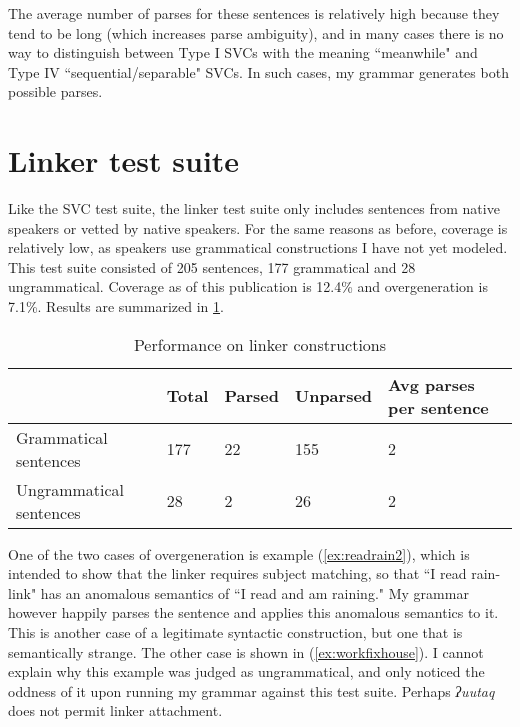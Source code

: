 The average number of parses for these sentences is relatively high because they tend to be long (which increases parse ambiguity), and in many cases there is no way to distinguish between Type I SVCs with the meaning ``meanwhile" and Type IV ``sequential/separable" SVCs. In such cases, my grammar generates both possible parses.

\section{Linker test suite} \label{ch:results:link}

Like the SVC test suite, the linker test suite only includes sentences from native speakers or vetted by native speakers. For the same reasons as before, coverage is relatively low, as speakers use grammatical constructions I have not yet modeled. This test suite consisted of 205 sentences, 177 grammatical and 28 ungrammatical. Coverage as of this publication is 12.4\% and overgeneration is 7.1\%. Results are summarized in \cref{table:link-coverage}.

\vspace{-10pt}

\begin{table}[H]
\centering
\caption{Performance on linker constructions}
\label{table:link-coverage}
\begin{tabular}{l|llll}
 & Total & Parsed & Unparsed & Avg parses per sentence \\ \hline
Grammatical sentences & 177 & 22 & 155 & 2 \\ \hline
Ungrammatical sentences & 28 & 2 & 26 & 2
\end{tabular}
\end{table}

\vspace{-10pt}

One of the two cases of overgeneration is example (\ref{ex:readrain2}), which is intended to show that the linker requires subject matching, so that ``I read rain-link" has an anomalous semantics of ``I read and am raining." My grammar however happily parses the sentence and applies this anomalous semantics to it. This is another case of a legitimate syntactic construction, but one that is semantically strange. The other case is shown in (\ref{ex:workfixhouse}). I cannot explain why this example was judged as ungrammatical, and only noticed the oddness of it upon running my grammar against this test suite. Perhaps \textit{ʔuutaq} does not permit linker attachment.

